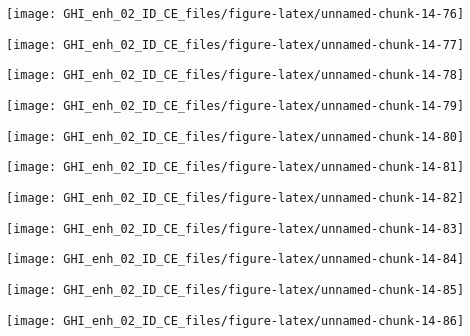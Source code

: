\documentclass[
  10pt,
  a4paper,oneside]{article}
\begin{document}
\begin{center}\texttt{[image: GHI\_enh\_02\_ID\_CE\_files/figure-latex/unnamed-chunk-14-76]} \end{center}

\begin{center}\texttt{[image: GHI\_enh\_02\_ID\_CE\_files/figure-latex/unnamed-chunk-14-77]} \end{center}

\begin{center}\texttt{[image: GHI\_enh\_02\_ID\_CE\_files/figure-latex/unnamed-chunk-14-78]} \end{center}

\begin{center}\texttt{[image: GHI\_enh\_02\_ID\_CE\_files/figure-latex/unnamed-chunk-14-79]} \end{center}

\begin{center}\texttt{[image: GHI\_enh\_02\_ID\_CE\_files/figure-latex/unnamed-chunk-14-80]} \end{center}

\begin{center}\texttt{[image: GHI\_enh\_02\_ID\_CE\_files/figure-latex/unnamed-chunk-14-81]} \end{center}

\begin{center}\texttt{[image: GHI\_enh\_02\_ID\_CE\_files/figure-latex/unnamed-chunk-14-82]} \end{center}

\begin{center}\texttt{[image: GHI\_enh\_02\_ID\_CE\_files/figure-latex/unnamed-chunk-14-83]} \end{center}

\begin{center}\texttt{[image: GHI\_enh\_02\_ID\_CE\_files/figure-latex/unnamed-chunk-14-84]} \end{center}

\begin{center}\texttt{[image: GHI\_enh\_02\_ID\_CE\_files/figure-latex/unnamed-chunk-14-85]} \end{center}

\begin{center}\texttt{[image: GHI\_enh\_02\_ID\_CE\_files/figure-latex/unnamed-chunk-14-86]} \end{center}
\end{document}
